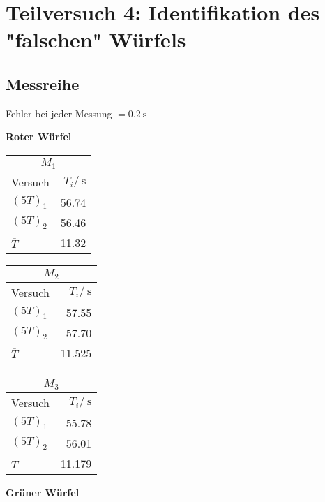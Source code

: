 \section{Teilversuch 4: Identifikation des "falschen" Würfels}
	\subsection{Messreihe}
		Fehler bei jeder Messung $= \SI{0,2}{\second}$

		\textbf{Roter Würfel}
		\begin{multicols}{3}
			\begin{center}
				\begin{tabular}{lr}
				\multicolumn{2}{c}{$M_1$} \\
				\toprule
				Versuch & $T_i / \SI{}{\second}$ \\
				\midrule
				$(5T)_1$ & \SI{56.74}{} \\
				$(5T)_2$ & \SI{56.46}{} \\
				$\overbar{T}$ & \SI{11.32}{} \\
				\bottomrule
				\end{tabular}
			\end{center}
			\begin{center}
				\begin{tabular}{lr}
				\multicolumn{2}{c}{$M_2$} \\
				\toprule
				Versuch & $T_i / \SI{}{\second}$ \\
				\midrule
				$(5T)_1$ & \SI{57.55}{} \\
				$(5T)_2$ & \SI{57.70}{} \\
				$\overbar{T}$ & \SI{11.525}{} \\
				\bottomrule
				\end{tabular}
			\end{center}
			\begin{center}
				\begin{tabular}{lr}
				\multicolumn{2}{c}{$M_3$} \\
				\toprule
				Versuch & $T_i / \SI{}{\second}$ \\
				\midrule
				$(5T)_1$ & \SI{55.78}{} \\
				$(5T)_2$ & \SI{56.01}{} \\
				$\overbar{T}$ & \SI{11.179}{} \\
				\bottomrule
				\end{tabular}
			\end{center}
		\end{multicols}
		\textbf{Grüner Würfel}
